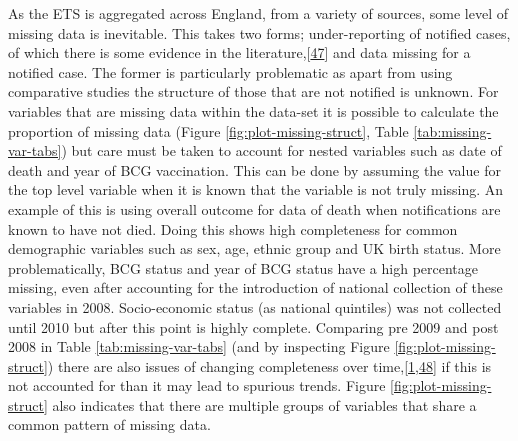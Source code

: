 \documentclass[11pt,twoside]{bristolthesis}
\begin{document}
  As the ETS is aggregated across England, from a variety of sources, some level of missing data is inevitable. This takes two forms; under-reporting of notified cases, of which there is some evidence in the literature,{[}\protect\hyperlink{ref-Pillaye2003}{47}{]} and data missing for a notified case. The former is particularly problematic as apart from using comparative studies the structure of those that are not notified is unknown. For variables that are missing data within the data-set it is possible to calculate the proportion of missing data (Figure \ref{fig:plot-missing-struct}, Table \ref{tab:missing-var-tabs}) but care must be taken to account for nested variables such as date of death and year of BCG vaccination. This can be done by assuming the value for the top level variable when it is known that the variable is not truly missing. An example of this is using overall outcome for data of death when notifications are known to have not died. Doing this shows high completeness for common demographic variables such as sex, age, ethnic group and UK birth status. More problematically, BCG status and year of BCG status have a high percentage missing, even after accounting for the introduction of national collection of these variables in 2008. Socio-economic status (as national quintiles) was not collected until 2010 but after this point is highly complete. Comparing pre 2009 and post 2008 in Table \ref{tab:missing-var-tabs} (and by inspecting Figure \ref{fig:plot-missing-struct}) there are also issues of changing completeness over time,{[}\protect\hyperlink{ref-PHE2017}{1},\protect\hyperlink{ref-PHE2016}{48}{]} if this is not accounted for than it may lead to spurious trends. Figure \ref{fig:plot-missing-struct} also indicates that there are multiple groups of variables that share a common pattern of missing data.
\end{document}
